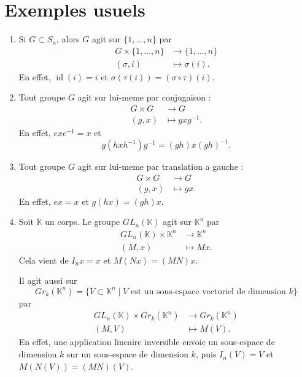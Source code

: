 \section*{Exemples usuels}

\begin{enumerate}
    \item Si $G \subset S_n$, alors $G$ agit sur $\{1,\dots,n\}$ par
    \[
    \begin{aligned}
        G \times \{1,\dots,n\} &\longrightarrow \{1,\dots,n\} \\
        (\sigma, i) &\longmapsto \sigma(i).
    \end{aligned}
    \]
    En effet, $\operatorname{id}(i)=i$ et
    $\sigma(\tau(i))=(\sigma\circ \tau)(i)$.

    \item Tout groupe $G$ agit sur lui-meme par conjugaison :
    \[
    \begin{aligned}
        G \times G &\longrightarrow G \\
        (g, x) &\longmapsto gxg^{-1}.
    \end{aligned}
    \]
    En effet, $exe^{-1}=x$ et
    \[
        g(hxh^{-1})g^{-1}=(gh)x(gh)^{-1}.
    \]

    \item Tout groupe $G$ agit sur lui-meme par translation a gauche :
    \[
    \begin{aligned}
        G \times G &\longrightarrow G \\
        (g, x) &\longmapsto gx.
    \end{aligned}
    \]
    En effet, $ex=x$ et $g(hx)=(gh)x$.

    \item Soit $\mathbb{K}$ un corps. Le groupe $GL_n(\mathbb{K})$ agit sur
    $\mathbb{K}^n$ par
    \[
    \begin{aligned}
        GL_n(\mathbb{K}) \times \mathbb{K}^n &\longrightarrow \mathbb{K}^n \\
        (M, x) &\longmapsto Mx.
    \end{aligned}
    \]
    Cela vient de $I_nx=x$ et $M(Nx)=(MN)x$.

    Il agit aussi sur
    \[
        Gr_k(\mathbb{K}^n)
        = \{ V \subset \mathbb{K}^n \mid V \text{ est un sous-espace vectoriel de dimension } k \}
    \]
    par
    \[
    \begin{aligned}
        GL_n(\mathbb{K}) \times Gr_k(\mathbb{K}^n) &\longrightarrow Gr_k(\mathbb{K}^n) \\
        (M, V) &\longmapsto M(V).
    \end{aligned}
    \]
    En effet, une application lineaire inversible envoie un sous-espace de
    dimension $k$ sur un sous-espace de dimension $k$, puis
    $I_n(V)=V$ et $M(N(V))=(MN)(V)$.
\end{enumerate}

